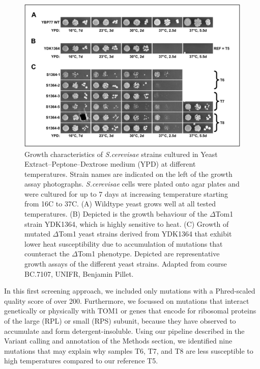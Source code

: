 \documentclass[10pt,a4paper]{article}
\begin{document}
\begin{figure}[h]
	\centering
	\includegraphics[width=0.7\linewidth]{img/yeastgrowth}
	\caption{\small Growth characteristics of \textit{S.cerevisae} strains cultured in Yeast Extract–Peptone–Dextrose medium (YPD) at different temperatures. Strain names are indicated on the left of the growth assay photographs. \textit{S.cerevisae} cells were plated onto agar plates and were cultured for up to 7 days at increasing temperature starting from 16\degree C to 37\degree C. (A) Wildtype yeast grows well at all tested temperatures. (B) Depicted is the growth behaviour of the $\Delta$Tom1 strain YDK1364, which is highly sensitive to heat. (C) Growth of mutated $\Delta$Tom1 yeast strains derived from YDK1364 that exhibit lower heat susceptibility due to accumulation of mutations that counteract the $\Delta$Tom1 phenotype. Depicted are representative growth assays of the different yeast strains. Adapted from course BC.7107, UNIFR, Benjamin Pillet.}
	\label{fig:yeastgrowth}
\end{figure}


\noindent In this first screening approach, we included only mutations with a Phred-scaled quality score of over 200. Furthermore, we focussed on mutations that interact genetically or physically with TOM1 or genes that encode for ribosomal proteins of the large (RPL) or small (RPS) subunit, because they have observed to accumulate and form detergent-insoluble. Using our pipeline described in the Variant calling and annotation of the Methods section, we identified nine mutations that may explain why samples T6, T7, and T8 are less susceptible to high temperatures compared to our reference T5.
\end{document}
